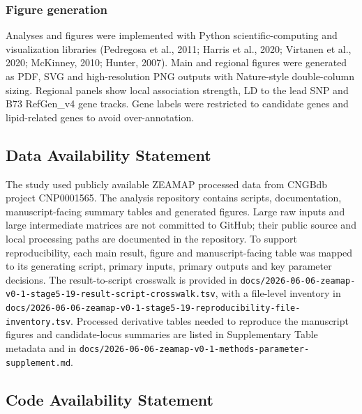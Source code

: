 \documentclass[
]{article}
\begin{document}
\subsubsection{Figure generation}\label{figure-generation}

Analyses and figures were implemented with Python scientific-computing
and visualization libraries (Pedregosa et al., 2011; Harris et al.,
2020; Virtanen et al., 2020; McKinney, 2010; Hunter, 2007). Main and
regional figures were generated as PDF, SVG and high-resolution PNG
outputs with Nature-style double-column sizing. Regional panels show
local association strength, LD to the lead SNP and B73 RefGen\_v4 gene
tracks. Gene labels were restricted to candidate genes and lipid-related
genes to avoid over-annotation.

\subsection{Data Availability
Statement}\label{data-availability-statement}

The study used publicly available ZEAMAP processed data from CNGBdb
project CNP0001565. The analysis repository contains scripts,
documentation, manuscript-facing summary tables and generated figures.
Large raw inputs and large intermediate matrices are not committed to
GitHub; their public source and local processing paths are documented in
the repository. To support reproducibility, each main result, figure and
manuscript-facing table was mapped to its generating script, primary
inputs, primary outputs and key parameter decisions. The
result-to-script crosswalk is provided in
\texttt{docs/2026-06-06-zeamap-v0-1-stage5-19-result-script-crosswalk.tsv},
with a file-level inventory in
\texttt{docs/2026-06-06-zeamap-v0-1-stage5-19-reproducibility-file-inventory.tsv}.
Processed derivative tables needed to reproduce the manuscript figures
and candidate-locus summaries are listed in Supplementary Table metadata
and in
\texttt{docs/2026-06-06-zeamap-v0-1-methods-parameter-supplement.md}.

\subsection{Code Availability
Statement}\label{code-availability-statement}
\end{document}
